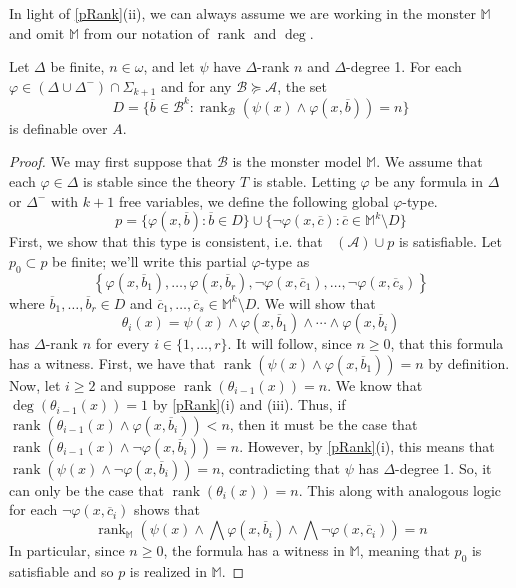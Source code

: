 \documentclass{article}
\newcommand\monster{\mathbb{M}}
\DeclareMathOperator{\Diagel}{Diag_{el}}
\DeclareMathOperator{\rank}{rank}
\let\mc\mathcal
\begin{document}
In light of \autoref{pRank}(ii), we can always assume we are working in the monster $\monster$ and omit $\monster$ from our notation of $\rank$ and $\deg$.

\begin{lemma}\label{dRank}
    Let $\Delta$ be finite, $n \in \omega$, and let $\psi$ have $\Delta$-rank $n$ and $\Delta$-degree 1. For each $\varphi \in (\Delta \cup \Delta^{-}) \cap \Sigma_{k+1}$ and for any $\mc{B} \succeq \mc{A}$, the set
    \[ D = \{ \overline{b} \in \mc{B}^{k} : \rank_{\mc{B}}(\psi(x) \land \varphi(x, \overline{b})) = n \} \]
    is definable over $A$.
\end{lemma}
\begin{proof}
    We may first suppose that $\mc{B}$ is the monster model $\monster$. We assume that each $\varphi \in \Delta$ is stable since the theory $T$ is stable. Letting $\varphi$ be any formula in $\Delta$ or $\Delta^{-}$ with $k+1$ free variables, we define the following global $\varphi$-type.
    \[ p = \{ \varphi(x, \overline{b}) : \overline{b} \in D \} \cup \{ \neg\varphi(x, \overline{c}) : \overline{c} \in \monster^{k} \setminus D \} \]
    First, we show that this type is consistent, i.e. that $\Diagel(\mc{A}) \cup p$ is satisfiable. Let $p_0 \subset p$ be finite; we'll write this partial $\varphi$-type as
    \[ \left\{ \varphi(x, \overline{b}_1), \ldots, \varphi(x, \overline{b}_r), \neg\varphi(x, \overline{c}_1), \ldots, \neg\varphi(x, \overline{c}_s) \right\} \]
    where $\overline{b}_1, \ldots, \overline{b}_r \in D$ and $\overline{c}_1, \ldots, \overline{c}_s \in \monster^{k} \setminus D$. We will show that
    \[ \theta_{i}(x) = \psi(x) \land \varphi(x, \overline{b}_1) \land \cdots \land \varphi(x, \overline{b}_i) \]
    has $\Delta$-rank $n$ for every $i \in \{ 1, \ldots, r \}$. It will follow, since $n \geq 0$, that this formula has a witness. First, we have that $\rank(\psi(x) \land \varphi(x, \overline{b}_1)) = n$ by definition. Now, let $i \geq 2$ and suppose $\rank(\theta_{i-1}(x)) = n$. We know that $\deg(\theta_{i-1}(x)) = 1$ by \autoref{pRank}(i) and (iii). Thus, if $\rank(\theta_{i-1}(x) \land \varphi(x, \overline{b}_i)) < n$, then it must be the case that $\rank(\theta_{i-1}(x) \land \neg\varphi(x, \overline{b}_i)) = n$. However, by \autoref{pRank}(i), this means that $\rank(\psi(x) \land \neg\varphi(x, \overline{b}_i)) = n$, contradicting that $\psi$ has $\Delta$-degree 1. So, it can only be the case that $\rank(\theta_{i}(x)) = n$. This along with analogous logic for each $\neg\varphi(x, \overline{c}_i)$ shows that
    \[ \rank_{\monster}\left( \psi(x) \land \bigwedge \varphi(x, \overline{b}_i) \land \bigwedge \neg\varphi(x, \overline{c}_i) \right) = n \]
    In particular, since $n \geq 0$, the formula has a witness in $\monster$, meaning that $p_0$ is satisfiable and so $p$ is realized in $\monster$.


\end{proof}
\end{document}
